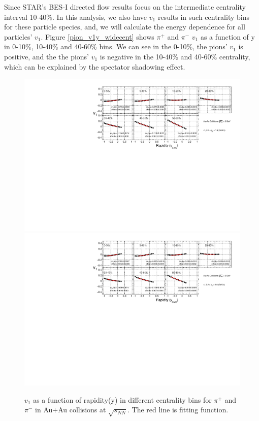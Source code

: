 Since STAR's BES-I directed flow results focus on the intermediate centrality interval 10-40\%. In this analysis, we also have $v_{1}$ results in such centrality bins for these particle species, and, we will calculate the energy dependence for all particles' $v_{1}$. Figure \ref{pion_v1y_widecent} shows $\pi^{+}$ and $\pi^{-}$ $v_{1}$ as a function of y in 0-10\%, 10-40\% and 40-60\% bins. We can see in the 0-10\%, the pions' $v_{1}$ is positive, and the the pions' $v_{1}$ is negative in the 10-40\% and 40-60\% centrality, which can be explained by the spectator shadowing effect.

\begin{figure}[h]
\includegraphics[scale=0.6]{chapter3/fig/v1ypikp/v1pionp_cent.pdf}
\includegraphics[scale=0.6]{chapter3/fig/v1ypikp/v1pionm_cent.pdf}
\caption{\label{pion_v1y_cent} $v_{1}$ as a function of rapidity(y) in different centrality bins for $\pi^{+}$ and $\pi^{-}$ in Au+Au collisions at $\sqrt{s_{NN}}$. The red line is fitting function.}
\end{figure}

